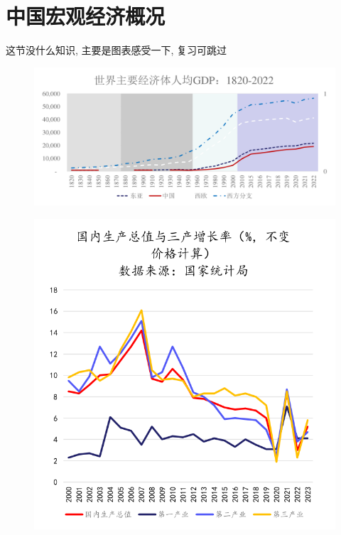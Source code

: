 \chapter{中国宏观经济概况}

这节没什么知识, 主要是图表感受一下, 复习可跳过

\begin{figure}[htbp]
    \centering
    \includegraphics[width=0.8\linewidth]{image/世界主要经济体人均.png}
\end{figure}

\begin{figure}[htbp]
    \centering
    \includegraphics[width=0.5\linewidth]{image/国内生产总值与三产增长率1.png}
\end{figure}

